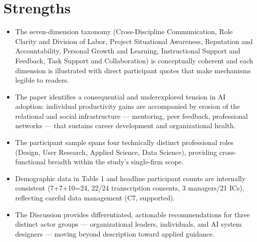 \documentclass[11pt]{article}
\begin{document}
\section*{Strengths}
\begin{itemize}[leftmargin=*]
  \item The seven-dimension taxonomy (Cross-Discipline Communication, Role Clarity and Division of Labor, Project Situational Awareness, Reputation and Accountability, Personal Growth and Learning, Instructional Support and Feedback, Task Support and Collaboration) is conceptually coherent and each dimension is illustrated with direct participant quotes that make mechanisms legible to readers.
  \item The paper identifies a consequential and underexplored tension in AI adoption: individual productivity gains are accompanied by erosion of the relational and social infrastructure — mentoring, peer feedback, professional networks — that sustains career development and organizational health.
  \item The participant sample spans four technically distinct professional roles (Design, User Research, Applied Science, Data Science), providing cross-functional breadth within the study's single-firm scope.
  \item Demographic data in Table 1 and headline participant counts are internally consistent (7+7+10=24, 22/24 transcription consents, 3 managers/21 ICs), reflecting careful data management (C7, supported).
  \item The Discussion provides differentiated, actionable recommendations for three distinct actor groups — organizational leaders, individuals, and AI system designers — moving beyond description toward applied guidance.
\end{itemize}
\end{document}
